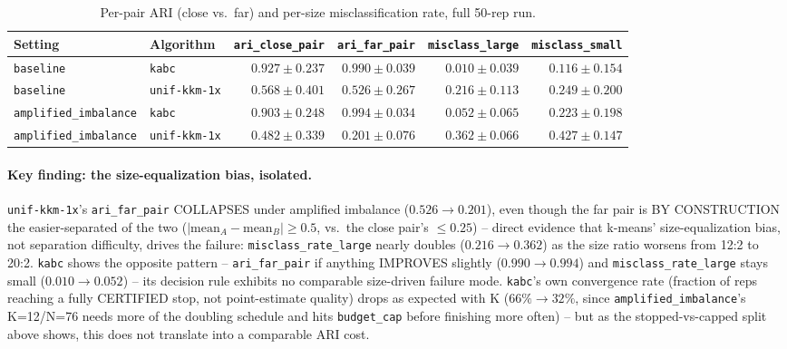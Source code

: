 \documentclass[11pt]{article}
\begin{document}
\begin{table}[h]
\centering
\small
\begin{tabular}{llrrrr}
\toprule
Setting & Algorithm & \texttt{ari\_close\_pair} & \texttt{ari\_far\_pair} & \texttt{misclass\_large} & \texttt{misclass\_small} \\
\midrule
\texttt{baseline} & \texttt{kabc} & $0.927 \pm 0.237$ & $0.990 \pm 0.039$ & $0.010 \pm 0.039$ & $0.116 \pm 0.154$ \\
\texttt{baseline} & \texttt{unif-kkm-1x} & $0.568 \pm 0.401$ & $0.526 \pm 0.267$ & $0.216 \pm 0.113$ & $0.249 \pm 0.200$ \\
\texttt{amplified\_imbalance} & \texttt{kabc} & $0.903 \pm 0.248$ & $0.994 \pm 0.034$ & $0.052 \pm 0.065$ & $0.223 \pm 0.198$ \\
\texttt{amplified\_imbalance} & \texttt{unif-kkm-1x} & $0.482 \pm 0.339$ & $0.201 \pm 0.076$ & $0.362 \pm 0.066$ & $0.427 \pm 0.147$ \\
\bottomrule
\end{tabular}
\caption{Per-pair ARI (close vs.\ far) and per-size misclassification rate,
full 50-rep run.}
\label{tab:exp4-breakdown}
\end{table}

\paragraph{Key finding: the size-equalization bias, isolated.}
\texttt{unif-kkm-1x}'s \texttt{ari\_far\_pair} COLLAPSES under amplified
imbalance ($0.526 \to 0.201$), even though the far pair is BY CONSTRUCTION
the easier-separated of the two ($|\text{mean}_A-\text{mean}_B|\ge 0.5$,
vs.\ the close pair's $\le 0.25$) -- direct evidence that k-means'
size-equalization bias, not separation difficulty, drives the failure:
\texttt{misclass\_rate\_large} nearly doubles ($0.216 \to 0.362$) as the
size ratio worsens from 12:2 to 20:2. \texttt{kabc} shows the opposite
pattern -- \texttt{ari\_far\_pair} if anything IMPROVES slightly ($0.990
\to 0.994$) and \texttt{misclass\_rate\_large} stays small ($0.010 \to
0.052$) -- its decision rule exhibits no comparable size-driven failure
mode. \texttt{kabc}'s own convergence rate (fraction of reps reaching a
fully CERTIFIED stop, not point-estimate quality) drops as expected with K
($66\% \to 32\%$, since \texttt{amplified\_imbalance}'s K=12/N=76 needs
more of the doubling schedule and hits \texttt{budget\_cap} before
finishing more often) -- but as the stopped-vs-capped split above shows,
this does not translate into a comparable ARI cost.
\end{document}
